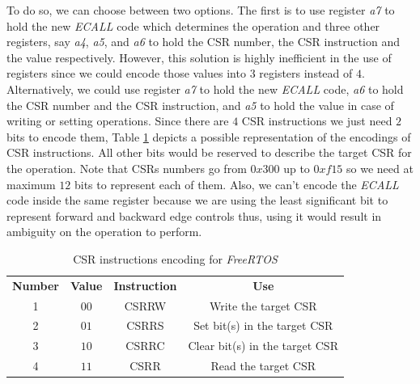 To do so, we can choose between two options. The first is to use register \textit{a7}
to hold the new \textit{ECALL} code which determines the operation and three other
registers, say \textit{a4}, \textit{a5}, and \textit{a6} to hold the CSR number,
the CSR instruction and the value respectively. However, this solution is highly
inefficient in the use of registers since we could encode those values into $3$
registers instead of $4$. Alternatively, we could use register \textit{a7} to hold
the new \textit{ECALL} code, \textit{a6} to hold the CSR number and the CSR
instruction, and \textit{a5} to hold the value in case of writing or setting
operations. Since there are $4$ CSR instructions we just need $2$ bits to encode
them, Table \ref{tab:instructionenc} depicts a possible representation of the
encodings of CSR instructions. All other bits would be reserved to describe the target
CSR for the operation. Note that CSRs numbers go from $0x300$ up to $0xf15$ so
we need at maximum $12$ bits to represent each of them. Also, we can't encode
the \textit{ECALL} code inside the same register because we are using the least significant
bit to represent forward and backward edge controls thus, using it would result
in ambiguity on the operation to perform.

\begin{table}
  \centering
  \begin{tabular}{|c|c|c|c|}
    \hline
    \textbf{Number} & \textbf{Value} & \textbf{Instruction} & \textbf{Use}                   \\
    \hhline{====} 1 & $00$           & CSRRW                & Write the target CSR           \\
    \hline
    2               & $01$           & CSRRS                & Set bit(s) in the target CSR   \\
    \hline
    3               & $10$           & CSRRC                & Clear bit(s) in the target CSR \\
    \hline
    4               & $11$           & CSRR                 & Read the target CSR            \\
    \hline
  \end{tabular}
  \caption{CSR instructions encoding for \textit{FreeRTOS}}
  \label{tab:instructionenc}
\end{table}

